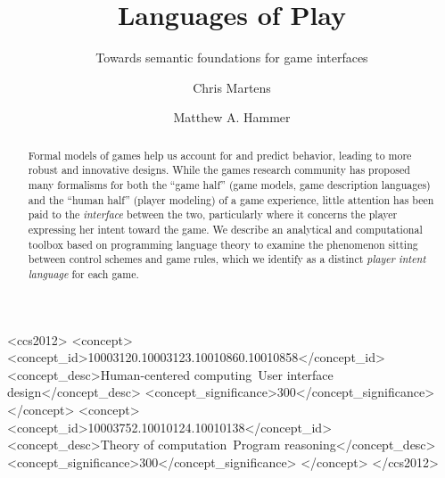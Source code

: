 \documentclass[sigconf]{acmart}
\begin{document}
\begin{CCSXML}
<ccs2012>
<concept>
<concept_id>10003120.10003123.10010860.10010858</concept_id>
<concept_desc>Human-centered computing~User interface design</concept_desc>
<concept_significance>300</concept_significance>
</concept>
<concept>
<concept_id>10003752.10010124.10010138</concept_id>
<concept_desc>Theory of computation~Program reasoning</concept_desc>
<concept_significance>300</concept_significance>
</concept>
</ccs2012>
\end{CCSXML}



\title{Languages of Play}
\subtitle{Towards semantic foundations for game interfaces}


\author{Chris Martens}

\author{Matthew A. Hammer}


\begin{abstract}
Formal models of games help us account for and predict behavior, leading to
more robust and innovative designs. While the games research community has 
proposed many formalisms for both the ``game half'' (game models, game
description languages) and the ``human half'' (player modeling) of a game
experience, little attention has been paid to the {\em interface} between
the two, particularly where it concerns the player expressing her intent
toward the game. We describe an analytical and computational toolbox based
on programming language theory to examine the phenomenon sitting between
control schemes and game rules, which we identify as a distinct {\em
player intent language} for each game.
\end{abstract}


\end{document}
